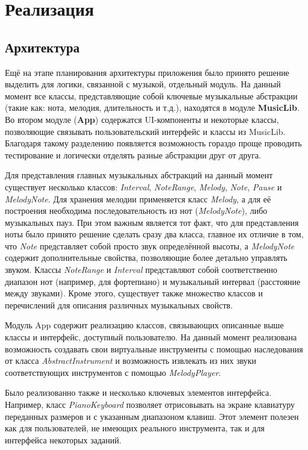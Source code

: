 \chapter{Реализация}
\section{Архитектура}
Ещё на этапе планирования архитектуры приложения было принято решение выделить для логики, связанной с музыкой, отдельный модуль. На данный момент все классы, представляющие собой ключевые музыкальные абстракции (такие как: нота, мелодия, длительность и т.д.), находятся в модуле \textbf{MusicLib}. Во втором модуле (\textbf{App}) содержатся UI-компоненты и некоторые классы, позволяющие связывать пользовательский интерфейс и классы из MusicLib. Благодаря такому разделению появляется возможность гораздо проще проводить тестирование и логически отделять разные абстракции друг от друга.\par
Для представления главных музыкальных абстракций на данный момент существует несколько классов: \textit{Interval}, \textit{NoteRange}, \textit{Melody}, \textit{Note}, \textit{Pause} и \textit{MelodyNote}. Для хранения мелодии применяется класс \textit{Melody}, а для её построения необходима последовательность из нот (\textit{MelodyNote}), либо музыкальных пауз. При этом важным является тот факт, что для представления ноты было принято решение сделать сразу два класса, главное их отличие в том, что \textit{Note} представляет собой просто звук определённой высоты, а \textit{MelodyNote} содержит дополнительные свойства, позволяющие более детально управлять звуком. Классы \textit{NoteRange} и \textit{Interval} представляют собой соответственно диапазон нот (например, для фортепиано) и музыкальный интервал (расстояние между звуками). Кроме этого, существует также множество классов и перечислений для описания различных музыкальных свойств.\par
Модуль App содержит реализацию классов, связывающих описанные выше классы и интерфейс, доступный пользователю. На данный момент реализована возможность создавать свои виртуальные инструменты с помощью наследования от класса \textit{AbstractInstrument} и возможность извлекать из них звуки соответствующих инструментов с помощью \textit{MelodyPlayer}.\par
Было реализованно также и несколько ключевых элементов интерфейса. Например, класс \textit{PianoKeyboard} позволяет отрисовывать на экране клавиатуру переданных размеров и с указанным диапазоном клавиш. Этот элемент полезен как для пользователей, не имеющих реального инструмента, так и для интерфейса некоторых заданий.
